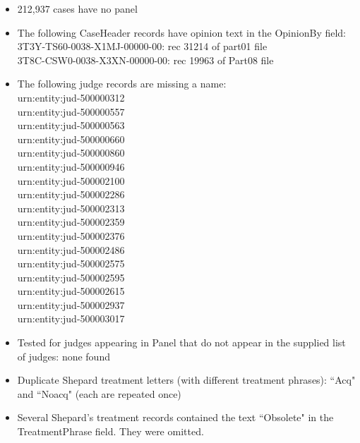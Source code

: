 \documentclass[10pt, letterpaper]{article}
\begin{document}
\begin{spacing}{1.0}
\begin{itemize}
    \item 212,937 cases have no panel
    
    \item {\color{red}The following CaseHeader records have opinion text in the OpinionBy field}:\\
    3T3Y-TS60-0038-X1MJ-00000-00:  rec 31214 of part01 file\\
    3T8C-CSW0-0038-X3XN-00000-00:  rec 19963 of Part08 file\\
    
    \item {\color{red}The following judge records are missing a name}:\\ 
    urn:entity:jud-500000312\\
    urn:entity:jud-500000557\\
    urn:entity:jud-500000563\\
    urn:entity:jud-500000660\\
    urn:entity:jud-500000860\\
    urn:entity:jud-500000946\\
    urn:entity:jud-500002100\\
    urn:entity:jud-500002286\\
    urn:entity:jud-500002313\\
    urn:entity:jud-500002359\\
    urn:entity:jud-500002376\\
    urn:entity:jud-500002486\\
    urn:entity:jud-500002575\\
    urn:entity:jud-500002595\\
    urn:entity:jud-500002615\\
    urn:entity:jud-500002937\\
    urn:entity:jud-500003017\\
    
    \item Tested for judges appearing in Panel that do not appear in the supplied list of judges:  none found
    
    \item {\color{red} Duplicate Shepard treatment letters (with different treatment phrases)}: ``Acq" and ``Noacq" (each are repeated once)
    
    \item Several Shepard's treatment records contained the text ``Obsolete" in the TreatmentPhrase field.  They were omitted.
    

\end{itemize}
\end{spacing}
\end{document}
